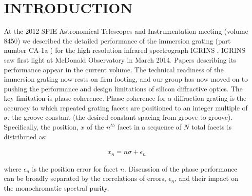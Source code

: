 \documentclass[]{spie}  %
\begin{document}


\section{INTRODUCTION}
\label{sec:intro}  %

At the 2012 SPIE Astronomical Telescopes and Instrumentation meeting (volume 8450) we described the detailed performance of the immersion grating (part number CA-1a \cite{2012SPIE.8450E..2SG}) for the high resolution infrared spectrograph IGRINS \cite{2010SPIE.7735E..54Y}.  IGRINS saw first light at McDonald Observatory in March 2014.  Papers describing its performance appear in the current volume\cite{2014SPIE.CHANPARK.IGRINS, 2014SPIE.BROOKS.GRATINGS}.  The technical readiness of the immersion grating now rests on firm footing, and our group has now moved on to pushing the performance and design limitations of silicon diffractive optics.  The key limitation is phase coherence.  Phase coherence for a diffraction grating is the accuracy to which repeated grating facets are positioned to an integer multiple of $\sigma$, the groove constant (the desired constant spacing from groove to groove).  Specifically, the position, $x$ of the $n^{th}$ facet in a sequence of $N$ total facets is distributed as: 

\begin{eqnarray}
x_n = n\sigma + \epsilon_n  \label{eqn:Epsilon}
\end{eqnarray}

where $\epsilon_n$ is the position error for facet $n$.  Discussion of the phase performance can be broadly separated by the correlations  of errors, $\epsilon_n$, and their impact on the monochromatic spectral purity.  
\end{document}
